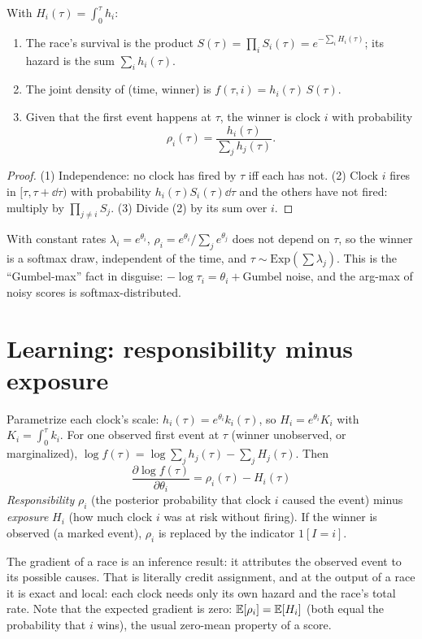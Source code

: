\documentclass[11pt]{article}
\begin{document}
\begin{proposition}
With $H_i(\tau)=\int_0^\tau h_i$:
\begin{enumerate}
\item The race's survival is the product $S(\tau)=\prod_i S_i(\tau)=e^{-\sum_i H_i(\tau)}$; its hazard is the sum $\sum_i h_i(\tau)$.
\item The joint density of (time, winner) is $f(\tau,i)=h_i(\tau)\,S(\tau)$.
\item Given that the first event happens at $\tau$, the winner is clock $i$ with probability
\[
\rho_i(\tau)=\frac{h_i(\tau)}{\sum_j h_j(\tau)} .
\]
\end{enumerate}
\end{proposition}
\begin{proof}
(1) Independence: no clock has fired by $\tau$ iff each has not. (2) Clock $i$ fires in $[\tau,\tau+\dd\tau)$ with probability
$h_i(\tau)S_i(\tau)\dd\tau$ and the others have not fired: multiply by $\prod_{j\neq i}S_j$. (3) Divide (2) by its sum over $i$.
\end{proof}

\begin{example}[Exponential race = softmax]
With constant rates $\lambda_i=e^{\theta_i}$, $\rho_i=e^{\theta_i}/\sum_j e^{\theta_j}$ does not depend on $\tau$, so the winner is a
softmax draw, independent of the time, and $\tau\sim\mathrm{Exp}(\sum\lambda_j)$. This is the ``Gumbel-max'' fact in disguise:
$-\log\tau_i=\theta_i+\text{Gumbel noise}$, and the arg-max of noisy scores is softmax-distributed.
\end{example}

\section{Learning: responsibility minus exposure}
Parametrize each clock's scale: $h_i(\tau)=e^{\theta_i}k_i(\tau)$, so $H_i=e^{\theta_i}K_i$ with $K_i=\int_0^\tau k_i$.
For one observed first event at $\tau$ (winner unobserved, or marginalized), $\log f(\tau)=\log\sum_j h_j(\tau)-\sum_j H_j(\tau)$. Then
\[
\boxed{\;\frac{\partial \log f(\tau)}{\partial\theta_i}=\rho_i(\tau)-H_i(\tau)\;}
\]
\emph{Responsibility} $\rho_i$ (the posterior probability that clock $i$ caused the event) minus \emph{exposure} $H_i$ (how much
clock $i$ was at risk without firing). If the winner is observed (a marked event), $\rho_i$ is replaced by the indicator $1[I=i]$.

\begin{keyidea}
The gradient of a race is an inference result: it attributes the observed event to its possible causes. That is literally
credit assignment, and at the output of a race it is exact and local: each clock needs only its own hazard and the race's total
rate. Note that the expected gradient is zero: $\mathbb{E}[\rho_i]=\mathbb{E}[H_i]$ (both equal the probability that $i$ wins), the usual
zero-mean property of a score.
\end{keyidea}
\end{document}
